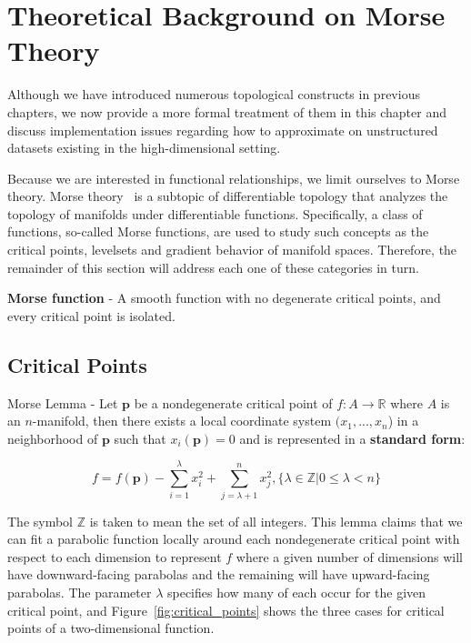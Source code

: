 
\chapter{Theoretical Background on Morse Theory}
\label{ch:theory}

Although we have introduced numerous topological constructs in previous chapters, we now provide a more formal treatment of them in this chapter and discuss implementation issues regarding how to approximate on unstructured datasets existing in the high-dimensional setting.

Because we are interested in functional relationships, we limit ourselves to Morse theory.
%
Morse theory~\cite{Matsumoto2002,Milnor1973,Morse1949} is a subtopic of differentiable topology that analyzes the topology of manifolds under differentiable functions.
%
Specifically, a class of functions, so-called Morse functions, are used to study such concepts as the critical points, levelsets and gradient behavior of manifold spaces.
%
Therefore, the remainder of this section will address each one of these categories in turn.

\begin{defn}
  \textbf{Morse function} - A smooth function with no degenerate critical points, and every critical point is isolated.
\end{defn}

\section{Critical Points}

\begin{lem} Morse Lemma - Let $\mathbf{p}$ be a nondegenerate critical point of $f : A \rightarrow \mathbb{R}$ where $A$ is an $n$-manifold, then there exists a local coordinate system $(x_1,...,x_n$) in a neighborhood of $\mathbf{p}$ such that $x_i(\mathbf{p}) = 0$ and is represented in a \textbf{standard form}:

\begin{equation}
f = f(\mathbf{p}) - \sum_{i=1}^{\lambda}x_i^2 + \sum_{j=\lambda+1}^n x_j^2, \{\lambda \in \mathbb{Z} | 0 \leq \lambda < n\}
\end{equation}
\end{lem}

The symbol $\mathbb{Z}$ is taken to mean the set of all integers.
%
This lemma claims that we can fit a parabolic function locally around each nondegenerate critical point with respect to each dimension to represent $f$ where a given number of dimensions will have downward-facing parabolas and the remaining will have upward-facing parabolas.
%
The parameter $\lambda$ specifies how many of each occur for the given critical point, and Figure~\ref{fig:critical_points} shows the three cases for critical points of a two-dimensional function.

